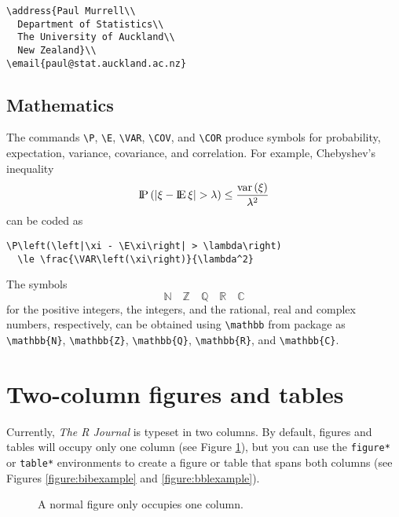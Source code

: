 \begin{verbatim}
\address{Paul Murrell\\
  Department of Statistics\\
  The University of Auckland\\
  New Zealand}\\
\email{paul@stat.auckland.ac.nz}
\end{verbatim}

\subsection{Mathematics}

The commands \verb|\P|, \verb|\E|, \verb|\VAR|, \verb|\COV|, and \verb|\COR| produce symbols
for probability, expectation, variance, covariance, and correlation.
For example, Chebyshev's inequality
\begin{displaymath}
\P\left(\left|\xi - \E\xi\right| > \lambda\right) \le \frac{\VAR\left(\xi\right)}{\lambda^2}
\end{displaymath}
can be coded as
\begin{verbatim}
\P\left(\left|\xi - \E\xi\right| > \lambda\right) 
  \le \frac{\VAR\left(\xi\right)}{\lambda^2}
\end{verbatim}

The symbols
\begin{displaymath}
\mathbb{N}\quad\mathbb{Z}\quad\mathbb{Q}\quad\mathbb{R}\quad\mathbb{C}
\end{displaymath}
for the positive integers, the integers, and the rational, real and
complex numbers, respectively, can be obtained using \verb|\mathbb| from
package  as
\verb|\mathbb{N}|, \verb|\mathbb{Z}|, \verb|\mathbb{Q}|, \verb|\mathbb{R}|,
and \verb|\mathbb{C}|.

\section{Two-column figures and tables}

Currently, \emph{The R Journal} is typeset in two columns.
By default, figures and tables will occupy only one
column (see Figure \ref{figure:onecolfig}),
but you can use the \verb|figure*| or
\verb|table*| environments to create a figure or
table that spans both columns (see Figures \ref{figure:bibexample}
and \ref{figure:bblexample}).

\begin{figure}
\vspace*{.1in}
\caption{\label{figure:onecolfig}
A normal figure only occupies one column.}
\end{figure}

